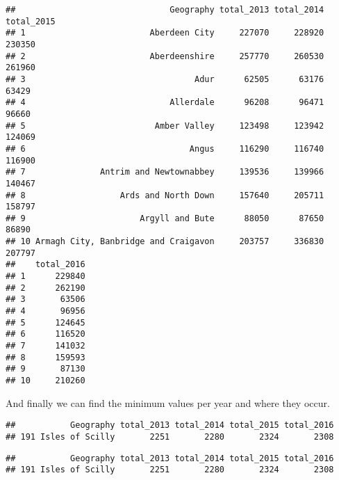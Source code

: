 \documentclass[]{article}
\newenvironment{Shaded}{\begin{snugshade}}{\end{snugshade}}
\newcommand{\KeywordTok}[1]{\textcolor[rgb]{0.13,0.29,0.53}{\textbf{#1}}}
\newcommand{\DecValTok}[1]{\textcolor[rgb]{0.00,0.00,0.81}{#1}}
\newcommand{\CommentTok}[1]{\textcolor[rgb]{0.56,0.35,0.01}{\textit{#1}}}
\newcommand{\OperatorTok}[1]{\textcolor[rgb]{0.81,0.36,0.00}{\textbf{#1}}}
\newcommand{\NormalTok}[1]{#1}
\begin{document}
\begin{verbatim}
##                               Geography total_2013 total_2014 total_2015
## 1                         Aberdeen City     227070     228920     230350
## 2                         Aberdeenshire     257770     260530     261960
## 3                                  Adur      62505      63176      63429
## 4                             Allerdale      96208      96471      96660
## 5                          Amber Valley     123498     123942     124069
## 6                                 Angus     116290     116740     116900
## 7               Antrim and Newtownabbey     139536     139966     140467
## 8                   Ards and North Down     157640     205711     158797
## 9                       Argyll and Bute      88050      87650      86890
## 10 Armagh City, Banbridge and Craigavon     203757     336830     207797
##    total_2016
## 1      229840
## 2      262190
## 3       63506
## 4       96956
## 5      124645
## 6      116520
## 7      141032
## 8      159593
## 9       87130
## 10     210260
\end{verbatim}

And finally we can find the minimum values per year and where they
occur.

\begin{Shaded}
\end{Shaded}

\begin{verbatim}
##           Geography total_2013 total_2014 total_2015 total_2016
## 191 Isles of Scilly       2251       2280       2324       2308
\end{verbatim}

\begin{Shaded}
\end{Shaded}

\begin{verbatim}
##           Geography total_2013 total_2014 total_2015 total_2016
## 191 Isles of Scilly       2251       2280       2324       2308
\end{verbatim}
\end{document}
